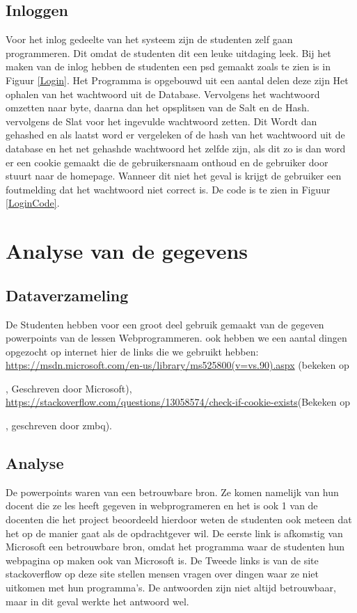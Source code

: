 \documentclass[11pt]{article}
\begin{document}
	\subsection{Inloggen}
	Voor het inlog gedeelte van het systeem zijn de studenten zelf gaan programmeren. Dit omdat de studenten dit een leuke uitdaging leek. Bij het maken van de inlog hebben de studenten een psd gemaakt zoals te zien is in Figuur \ref{Login}. Het Programma is opgebouwd uit een aantal delen deze zijn Het ophalen van het wachtwoord uit de Database. Vervolgens het wachtwoord omzetten naar byte, daarna dan het opsplitsen van de Salt en de Hash. vervolgens de Slat voor het ingevulde wachtwoord zetten. Dit Wordt dan gehashed en als laatst word er vergeleken of de hash van het wachtwoord uit de database en het net gehashde wachtwoord het zelfde zijn, als dit zo is dan word er een cookie gemaakt die de gebruikersnaam onthoud en de gebruiker door stuurt naar de homepage. Wanneer dit niet het geval is krijgt de gebruiker een foutmelding dat het wachtwoord niet correct is. De code is te zien in Figuur \ref{LoginCode}.
	\newpage
	
	\section{Analyse van de gegevens}
	
	\subsection{Dataverzameling}
	De Studenten hebben voor een groot deel gebruik gemaakt van de gegeven powerpoints van de lessen Webprogrammeren. ook hebben we een aantal dingen opgezocht op internet hier de links die we gebruikt hebben: \url{https://msdn.microsoft.com/en-us/library/ms525800(v=vs.90).aspx} (bekeken op \date{19-01-2018}, Geschreven door Microsoft), \newline \url{https://stackoverflow.com/questions/13058574/check-if-cookie-exists}(Bekeken op \date{19-01-2018}, geschreven door zmbq).
	
	\subsection{Analyse}
	De powerpoints waren van een betrouwbare bron. Ze komen namelijk van hun docent die ze les heeft gegeven in webprogrameren en het is ook 1 van de docenten die het project beoordeeld hierdoor weten de studenten ook meteen dat het op de manier gaat als de opdrachtgever wil. De eerste link is afkomstig van Microsoft een betrouwbare bron, omdat het programma waar de studenten hun webpagina op maken ook van Microsoft is. De Tweede links is van de site stackoverflow op deze site stellen mensen vragen over dingen waar ze niet uitkomen met hun programma's. De antwoorden zijn niet altijd betrouwbaar, maar in dit geval werkte het antwoord wel.
\end{document}
